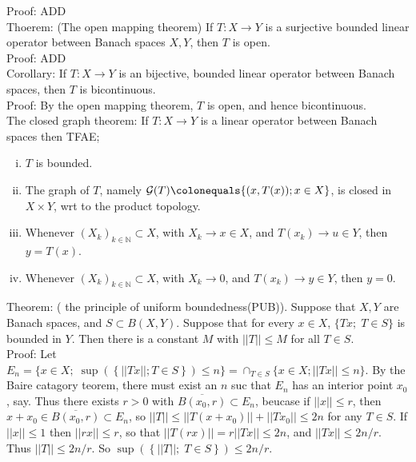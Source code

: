 \documentclass[12pt]{article}
\newcommand{\rarw}[0] { \rightarrow }
\newcommand{ \defeq }[0] { \colonequals }
\newcommand{\nats}[0] { \mathbb{N}}
\newcommand{\G}[0] { \mathcal{G} }
\newcommand{ \SUP }[1] { \sup \left( \left\{ #1 \right\} \right) }
\begin{document}
\noindent
Proof: ADD \\

Thoerem: (The open mapping theorem) If $T: X \rarw Y$ is a surjective bounded linear operator between Banach spaces $X,Y$, then $T$ is open.\\

\noindent
Proof: ADD \\

Corollary: If $T: X \rarw Y$ is an bijective, bounded linear operator between Banach spaces, then $T$ is bicontinuous.  \\

\noindent
Proof: By the open mapping theorem, $T$ is open, and hence bicontinuous. \\

The closed graph theorem: If $T: X \rarw Y$ is a linear operator between Banach spaces then TFAE;

\begin{enumerate}[i)]
\item
$T$ is bounded. 
\item
The graph of $T$, namely $\G(T) \defeq \{  (x, T(x)); x \in X \}$, is closed in $X \times Y$, wrt to the product topology.
\item
Whenever $(X_k)_{k \in \nats} \subset X$, with $X_k \rarw x \in X$, and $T(x_k) \rarw u \in Y$, then $y = T(x)$.
\item 
Whenever  $(X_k)_{k \in \nats} \subset X$, with $X_k \rarw 0$, and $T(x_k) \rarw y \in Y$, then $y=0$.
\end{enumerate}


Theorem: ( the principle of uniform boundedness(PUB)). Suppose that $X,Y$ are Banach spaces, and $S \subset B(X,Y)$. Suppose that for every $x \in X$, $\{ Tx; \; T \in S\}$ is bounded in $Y$. Then there is a constant $M$ with $||T|| \le M$ for all $T \in S$. \\

\noindent
Proof: Let $E_n = \{ x \in X; \;  \SUP{ ||Tx||; T \in S } \le n \} = \cap_{T \in S} \{ x \in X; ||Tx|| \le n \}$.  By the Baire catagory teorem, there must exist an $n$ suc that $E_n$ has an interior point $x_0$, say. Thus there exists $r >0$ with $\overline{ B(x_0, r) } \subset E_n$, beucase if $||x|| \le r$, then $x + x_0 \in \overline{ B(x_0, r) } \subset E_n$, so $||T|| \le ||T(x+x_0)|| + ||Tx_0|| \le 2n$ for any $T \in S$. If $||x|| \le 1$ then $||r x || \le r$, so that $||T(rx)|| = r ||Tx|| \le 2n$, and $||Tx|| \le 2n/r$. Thus $||T|| \le 2n/r$. So $ \SUP{ ||T||; \; T \in S } \le 2n/r$.  \\ 
\end{document}
